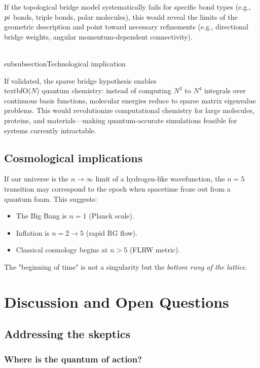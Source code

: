\documentclass[aps,prd,twocolumn,superscriptaddress,groupedaddress,showpacs]{revtex4-2}
\begin{document}
If the topological bridge model systematically fails for specific bond types (e.g., $\\pi$ bonds, triple bonds, polar molecules), this would reveal the limits of the geometric description and point toward necessary refinements (e.g., directional bridge weights, angular momentum-dependent connectivity).

\\subsubsection{Technological implication}

If validated, the sparse bridge hypothesis enables \\textbf{O($N$) quantum chemistry}: instead of computing $N^3$ to $N^4$ integrals over continuous basis functions, molecular energies reduce to sparse matrix eigenvalue problems. This would revolutionize computational chemistry for large molecules, proteins, and materials---making quantum-accurate simulations feasible for systems currently intractable.

\subsection{Cosmological implications}

If our universe is the $n \to \infty$ limit of a hydrogen-like wavefunction, the $n=5$ transition may correspond to the epoch when spacetime froze out from a quantum foam. This suggests:
\begin{itemize}
\item The Big Bang is $n=1$ (Planck scale).
\item Inflation is $n=2 \to 5$ (rapid RG flow).
\item Classical cosmology begins at $n > 5$ (FLRW metric).
\end{itemize}

The "beginning of time" is not a singularity but the \emph{bottom rung of the lattice}.

\section{Discussion and Open Questions}

\subsection{Addressing the skeptics}

\subsubsection{Where is the quantum of action?}
\end{document}
